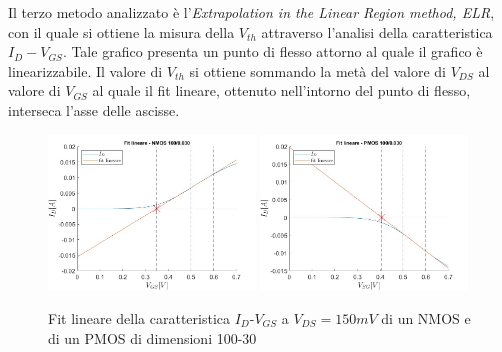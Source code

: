 \documentclass[12pt, letterpaper]{book}
\begin{document}
Il terzo metodo analizzato è l'\emph{Extrapolation in the Linear Region method, ELR}, con il quale si ottiene la misura della $V_{th}$ attraverso l'analisi della caratteristica $I_D-V_{GS}$.  Tale grafico presenta un punto di flesso attorno al quale il grafico è linearizzabile. Il valore di $V_{th}$ si ottiene sommando la metà del valore di $V_{DS}$ al valore di $V_{GS}$ al quale il fit lineare, ottenuto nell'intorno del punto di flesso, interseca l'asse delle ascisse.\\


\begin{figure}[h!]
  \centering
  \includegraphics[width=0.49\textwidth]{LinearFit-N4-100-30}
  \includegraphics[width=0.49\textwidth]{LinearFit-P1-100-30}
  \caption{Fit lineare della caratteristica  $I_D$-$V_{GS}$ a $V_{DS}=150mV$ di un NMOS e di un PMOS di dimensioni 100-30 }
\end{figure}
\end{document}
